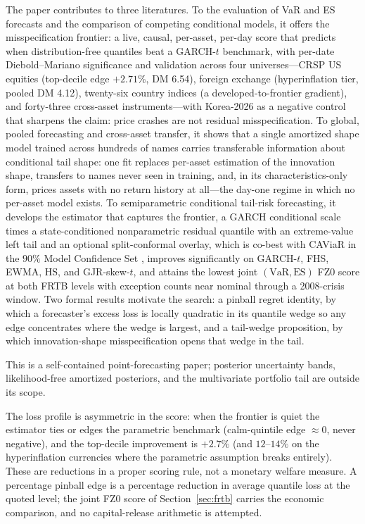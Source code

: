 \documentclass[11pt]{article}
\newcommand{\VaR}{\mathrm{VaR}}
\newcommand{\ES}{\mathrm{ES}}
\theoremstyle{remark}
\begin{document}
\medskip\noindent The paper contributes to three literatures. To the
evaluation of VaR and ES forecasts and the comparison of competing
conditional models, it offers the misspecification frontier: a live,
causal, per-asset, per-day score that predicts when distribution-free
quantiles beat a GARCH-$t$ benchmark, with per-date Diebold--Mariano
significance and validation across four universes---CRSP US equities
(top-decile edge $+2.71\%$, DM 6.54), foreign exchange (hyperinflation
tier, pooled DM 4.12), twenty-six country indices (a
developed-to-frontier gradient), and forty-three cross-asset
instruments---with Korea-2026 as a negative control that sharpens the
claim: price crashes are not residual misspecification. To global,
pooled forecasting and cross-asset transfer, it shows that a single
amortized shape model trained across hundreds of names carries
transferable information about conditional tail shape: one fit replaces
per-asset estimation of the innovation shape, transfers to names never
seen in training, and, in its characteristics-only form, prices assets
with no return history at all---the day-one regime in which no
per-asset model exists. To semiparametric conditional tail-risk
forecasting, it develops the estimator that captures the frontier, a
GARCH conditional scale times a state-conditioned nonparametric
residual quantile with an extreme-value left tail and an optional
split-conformal overlay, which is co-best with CAViaR
\citep{engle2004caviar} in the $90\%$ Model Confidence Set
\citep{hansen2011mcs}, improves significantly on GARCH-$t$, FHS, EWMA,
HS, and GJR-skew-$t$, and attains the lowest joint $(\VaR,\ES)$ FZ0
score at both FRTB levels with exception counts near nominal through a
2008-crisis window. Two formal results motivate the search: a pinball
regret identity, by which a forecaster's excess loss is locally quadratic in
its quantile wedge so any edge concentrates where the wedge is largest,
and a tail-wedge proposition, by which innovation-shape misspecification
opens that wedge in the tail.

\medskip
\noindent This is a self-contained point-forecasting paper; posterior
uncertainty bands, likelihood-free amortized posteriors, and the
multivariate portfolio tail are outside its scope.

The loss profile is asymmetric in the score: when the frontier is
quiet the estimator ties or edges the parametric benchmark (calm-quintile
edge $\approx 0$, never negative), and the top-decile improvement is
$+2.7\%$ (and $12$--$14\%$ on the hyperinflation currencies where the
parametric assumption breaks entirely). These are reductions in a
proper scoring rule, not a monetary welfare measure. A
percentage pinball edge is a percentage reduction in average quantile
loss at the quoted level; the joint FZ0 score of
Section~\ref{sec:frtb} carries the economic comparison, and no
capital-release arithmetic is attempted.
\end{document}
